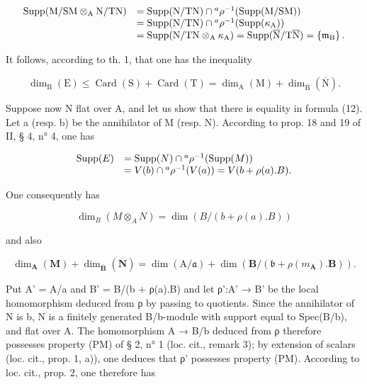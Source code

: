\[
\begin{array}{r l} \operatorname{Supp} (\mathrm{M} / \mathrm{SM} \otimes_ {\mathrm{A}} \mathrm{N} / \mathrm{TN}) & = \operatorname{Supp} (\mathrm{N} / \mathrm{TN}) \cap {} ^ {a} \rho^ {- 1} (\operatorname{Supp} (\mathrm{M} / \mathrm{SM})) \\ & = \operatorname{Supp} (\mathrm{N} / \mathrm{TN}) \cap {} ^ {a} \rho^ {- 1} (\operatorname{Supp} (\kappa_ {\mathrm{A}})) \\ & = \operatorname{Supp} (\mathrm{N} / \mathrm{TN} \otimes_ {\mathrm{A}} \kappa_ {\mathrm{A}}) = \operatorname{Supp} (\overline {{\mathrm{N}}} / \mathrm{T} \overline {{\mathrm{N}}}) = \left\{\mathfrak {m} _ {\mathrm{B}} \right\}. \end{array}
\]

It follows, according to th. 1, that one has the inequality

\[
\dim_ {\mathrm{B}} (\mathrm{E}) \leqslant \operatorname{Card} (\mathrm{S}) + \operatorname{Card} (\mathrm{T}) = \dim_ {\mathrm{A}} (\mathrm{M}) + \dim_ {\overline {{\mathrm{B}}}} (\overline {{\mathrm{N}}}).
\]

Suppose now N flat over A, and let us show that there is equality in formula (12). Let a (resp. b) be the annihilator of M (resp. N). According to prop. 18 and 19 of II, § 4, n° 4, one has

\[
\begin{array}{r l} \operatorname{Supp} (E) & = \operatorname{Supp} (N) \cap {} ^ {a} \rho^ {- 1} (\operatorname{Supp} (M)) \\ & = V (b) \cap {} ^ {a} \rho^ {- 1} (V (a)) = V (b + \rho (a). B). \end{array}
\]

One consequently has

\[
\dim_ {B} (M \otimes_ {A} N) = \dim (B / (b + \rho (a). B))\tag{13}
\]

and also

\[
\dim_ {\mathbf {A}} (\mathbf {M}) + \dim_ {\overline {{\mathbf {B}}}} (\overline {{\mathbf {N}}}) = \dim (\mathrm{A} / \mathfrak {a}) + \dim (\mathbf {B} / (\mathfrak {b} + \rho (m _ {\mathbf {A}}). \mathbf {B}))  .\tag{14}
\]

Put A' = A/a and B' = B/(b + ρ(a).B) and let ρ':A' → B' be the local homomorphism deduced from ρ by passing to quotients. Since the annihilator of N is b, N is a finitely generated B/b-module with support equal to Spec(B/b), and flat over A. The homomorphism A → B/b deduced from ρ therefore possesses property (PM) of § 2, n° 1 (loc. cit., remark 3); by extension of scalars (loc. cit., prop. 1, a)), one deduces that ρ' possesses property (PM). According to loc. cit., prop. 2, one therefore has

